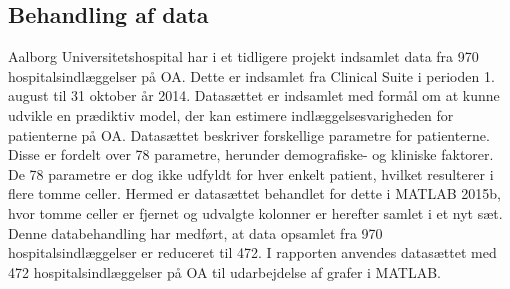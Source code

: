 \subsection{Behandling af data}
Aalborg Universitetshospital har i et tidligere projekt indsamlet data fra 970 hospitalsindlæggelser på OA. Dette er indsamlet fra Clinical Suite i perioden 1. august til 31 oktober år 2014. Datasættet er indsamlet med formål om at kunne udvikle en prædiktiv model, der kan estimere indlæggelsesvarigheden for patienterne på OA. Datasættet beskriver forskellige parametre for patienterne. Disse er fordelt over 78 parametre, herunder demografiske- og kliniske faktorer. De 78 parametre er dog ikke udfyldt for hver enkelt patient, hvilket resulterer i flere tomme celler. Hermed er datasættet behandlet for dette i MATLAB 2015b, hvor tomme celler er fjernet og udvalgte kolonner er herefter samlet i et nyt sæt. Denne databehandling har medført, at data opsamlet fra 970 hospitalsindlæggelser er reduceret til 472. I rapporten anvendes datasættet med 472 hospitalsindlæggelser på OA til udarbejdelse af grafer i MATLAB. 
